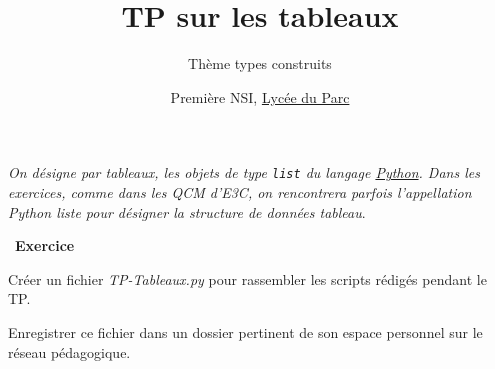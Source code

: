 \documentclass[
  11pt,
]{article}
\title{TP sur les tableaux}
\subtitle{Thème types construits}
\author{Première NSI, \href{https://frederic-junier.org/}{Lycée du Parc}}
\date{}
\newcommand{\passthrough}[1]{#1}
\newcounter{exo}
\newenvironment{exercice}[1]
{\par \medskip   \addtocounter{exo}{1} \noindent  
\begin{bclogo}[arrondi =0.1,   noborder = true, logo=\bccrayon, marge=4]{~\textbf{Exercice} \textbf{\theexo} {\itshape #1} }  \par}
{
\end{bclogo}
 \par \bigskip }
\begin{document}
\maketitle

\emph{On désigne par tableaux, les objets de type
\passthrough{\lstinline!list!} du langage
\href{https://docs.python.org/3/tutorial/datastructures.html}{Python}.
Dans les exercices, comme dans les QCM d'E3C, on rencontrera parfois
l'appellation Python liste pour désigner la structure de données
tableau}.

\begin{exercice}{}

Créer un fichier \emph{TP-Tableaux.py} pour rassembler les scripts
rédigés pendant le TP.

Enregistrer ce fichier dans un dossier pertinent de son espace personnel
sur le réseau pédagogique.

\end{exercice}
\end{document}
